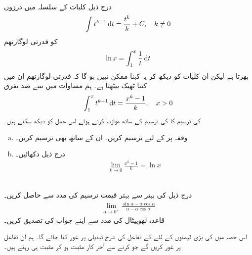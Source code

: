\\
درج ذیل کلیات کے  سلسلہ میں  درزوں  
\begin{align}\label{مساوات_سوال_ماورائی_لوگارتھم}
\int t^{k-1}\dif t=\frac{t^k}{k}+C,\quad k\ne 0
\end{align}
کو قدرتی لوگارتھم
\begin{align*}
\ln x=\int_1^x\frac{1}{t}\dif t
\end{align*}
بھرتا ہے لیکن ان کلیات  کو دیکھ کر یہ کہنا ممکن نہیں ہو گا کہ قدرتی لوگارتھم ان میں کتنا  ٹھیک بیٹھتا ہے۔ ہم مساوات  میں سے ضد تفرق 
\begin{align*}
\int_1^xt^{k-1}\dif t=\frac{x^k-1}{k},\quad x>0
\end{align*}
کی ترسیم کا  کی ترسیم کے ساتھ موازنہ کرتے ہوئے اس عمل کو دیکھ سکتے ہیں۔
\begin{enumerate}[a.]
\item
وقفہ  پر  کے لیے   ترسیم کریں۔ ان کے ساتھ  بھی ترسیم کریں۔
\item
درج ذیل دکھائیں۔
\begin{align*}
\lim_{k\to 0}\frac{x^k-1}{k}=\ln x
\end{align*}
\end{enumerate}
\\
درج ذیل کی بہتر سے بہتر قیمت ترسیم کی مدد سے حاصل کریں۔
\begin{align*}
\lim_{\alpha\to 0^+}\frac{\sin\alpha-\alpha\cos\alpha}{\alpha-\alpha\cos\alpha}
\end{align*} 
قاعدہ لھوپیٹال کی مدد سے اپنے جواب کی تصدیق کریں۔



اس حصہ میں  کی بڑی  قیمتوں کے لئے   کے تفاعل کی شرح تبدیلی پر غور کیا جائے گا۔ ہم ان تفاعل پر غور کریں گے جو  کرنے سے آخر کار مثبت ہو کر مثبت ہی رہتے ہیں۔ 

